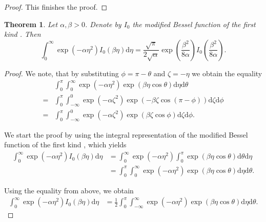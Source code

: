 \documentclass[a4paper,12pt]{article}
\theoremstyle{plain}
\newtheorem{theorem}{Theorem}[section]
\theoremstyle{definition}
\numberwithin{equation}{section}
\begin{document}
\begin{appendix}
\begin{proof}
		This finishes the proof.
	\end{proof}
	
	\newpage
	
	\begin{theorem}\label{thm: eqintbessel}
		Let $\alpha, \beta > 0$. Denote by $I_0$ the modified Bessel function of the first kind \cite[p.~910-911]{TISP}. Then
		\begin{equation}\label{eq: intbessel}
			\int_0^\infty \exp \left( - \alpha \eta^2 \right) I_0 ( \beta \eta ) \mathrm{d}\eta = \frac{\sqrt{\pi}}{2 \sqrt{\alpha}} \exp \left( \frac{\beta^2}{8 \alpha} \right) I_0 \left( \frac{\beta^2}{8 \alpha} \right).
		\end{equation}
	\end{theorem}
	\begin{proof}
		We note, that by substituting $\phi = \pi - \theta$ and $\zeta = - \eta$ we obtain the equality
		\begin{align*}
			&\int_0^\pi \int_0^\infty \exp \left( - \alpha \eta^2 \right) \exp \left( \beta \eta \cos \theta \right) \mathrm{d}\eta \mathrm{d}\theta \\
			=& \int_0^\pi \int_{-\infty}^0 \exp \left( - \alpha \zeta^2 \right) \exp \left( - \beta \zeta \cos \left( \pi - \phi \right) \right) \mathrm{d}\zeta \mathrm{d}\phi \\
			=& \int_0^\pi \int_{-\infty}^0 \exp \left( - \alpha \zeta^2 \right) \exp \left( \beta \zeta \cos \phi \right) \mathrm{d}\zeta \mathrm{d}\phi.
		\end{align*}
		
		We start the proof by using the integral representation of the modified Bessel function of the first kind \cite[p.~181]{Watson}, which yields
		\begin{align*}
			\int_0^\infty \exp \left( - \alpha \eta^2 \right) I_0 ( \beta \eta ) \mathrm{d}\eta &= \int_0^\infty \exp \left( - \alpha \eta^2 \right) \int_0^\pi \exp \left( \beta \eta \cos \theta \right) \mathrm{d}\theta \mathrm{d}\eta \\
			&= \int_0^\pi \int_0^\infty \exp \left( - \alpha \eta^2 \right) \exp \left( \beta \eta \cos \theta \right) \mathrm{d}\eta \mathrm{d}\theta.
		\end{align*}
		
		Using the equality from above, we obtain
		\begin{align*}
			\int_0^\infty \exp \left( - \alpha \eta^2 \right) I_0 ( \beta \eta ) \mathrm{d}\eta &= \frac{1}{2} \int_0^\pi \int_{-\infty}^\infty \exp \left( - \alpha \eta^2 \right) \exp \left( \beta \eta \cos \theta \right) \mathrm{d}\eta \mathrm{d}\theta.
		\end{align*}
		

\end{proof}
\end{appendix}
\end{document}

